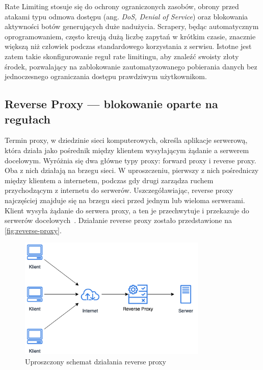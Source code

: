 Rate Limiting stosuje się do ochrony ograniczonych zasobów, obrony przed atakami typu odmowa dostępu (ang. \emph{DoS, Denial of Service})
oraz blokowania aktywności botów generujących duże nadużycia.
Scrapery, będąc automatycznym oprogramowaniem, często kreują dużą liczbę zapytań w krótkim czasie, znacznie większą niż człowiek podczas standardowego korzystania z serwisu.
Istotne jest zatem takie skonfigurowanie reguł rate limitingu, aby znaleźć swoisty złoty środek, pozwalający na zablokowanie zautomatyzowanego pobierania danych bez jednoczesnego ograniczania dostępu prawdziwym użytkownikom.

\newpage

\subsection{Reverse Proxy --- blokowanie oparte na regułach}\label{subsec:reverse-proxy}

Termin proxy, w dziedzinie sieci komputerowych, określa aplikacje serwerową, która działa jako pośrednik między klientem wysyłającym żądanie a serwerem docelowym.
Wyróżnia się dwa główne typy proxy: forward proxy i reverse proxy.
Oba z nich działają na brzegu sieci.
W uproszczeniu, pierwszy z nich pośredniczy między klientem a internetem, podczas gdy drugi zarządza ruchem przychodzącym z internetu do serwerów.
Uszczegóławiając, reverse proxy najczęściej znajduje się na brzegu sieci przed jednym lub wieloma serwerami.
Klient wysyła żądanie do serwera proxy, a ten je przechwytuje i przekazuje do serwerów docelowych~\cite{cloudflare-what-is-reverse-proxy}.
Działanie reverse proxy zostało przedstawione na \autoref{fig:reverse-proxy}.

\begin{figure}[H]
    \centering
    \captionsetup{width=.7\linewidth}
    \includegraphics[width=0.8\textwidth]{img/reverse-proxy}
    \caption{Uproszczony schemat działania reverse proxy}
    \label{fig:reverse-proxy}
\end{figure}

